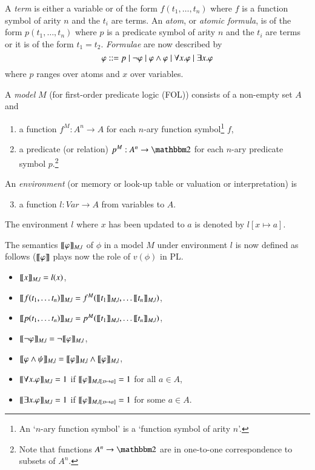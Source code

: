 \noindent
A \emph{term} is either a variable or of the form $f(t_1,\ldots,t_n)$
where $f$ is a function symbol of arity $n$ and the $t_i$ are terms.
An \emph{atom}, or \emph{atomic formula}, is of the form
$p(t_1,\ldots,t_n)$ where $p$ is a predicate symbol of arity $n$ and
the $t_i$ are terms or it is of the form $t_1=t_2$. \emph{Formulae}
are now described by
%
$$\varphi ::= p \mid  \neg\varphi \mid \varphi\wedge\varphi \mid
\forall x.\varphi\mid\exists x.\varphi$$
where $p$ ranges over atoms and $x$
over variables.

\bigskip\noindent A \emph{model} $M$ (for first-order predicate logic
(FOL)) consists of a non-empty set $A$ and
\begin{enumerate}
\item a function $f^M:A^n\to A$ for each
$n$-ary function symbol\footnote{An `$n$-ary function symbol' is a
  `function symbol of arity $n$'.}  $f$, 
\item a predicate (or relation) $p^M: A^n\to\bbtwo$ for each $n$-ary
  predicate symbol $p$.\footnote{Note that functions $A^n\to\bbtwo$ are in
    one-to-one correspondence to subsets of $A^n$.}
\end{enumerate}

\medskip\noindent
An \emph{environment} (or memory or look-up table or valuation or
interpretation) is
\begin{enumerate}\setcounter{enumi}{2}
\item a function $l:\mathit{Var}\to A$ from variables to
$A$.
\end{enumerate}
The environment $l$ where $x$ has been updated to $a$ is denoted by
$l[x\mapsto a]$. 

\bigskip\noindent
The semantics $[\![\varphi]\!]_{M,l}$ of $\phi$ in a model $M$ under
environment $l$ is now defined as follows ($[\![\varphi]\!]$ plays now the
role of $v(\phi)$ in PL.
%
\begin{itemize}
\item $[\![x]\!]_{M,l}=l(x)$,
\item $[\![f(t_1,\ldots t_n)]\!]_{M,l}=f^M([\![t_1]\!]_{M,l},\ldots
  [\![t_n]\!]_{M,l})$,
\item $[\![p(t_1,\ldots t_n)]\!]_{M,l}=p^M([\![t_1]\!]_{M,l},\ldots
  [\![t_n]\!]_{M,l})$,
\item $[\![\neg\varphi]\!]_{M,l}=\neg[\![\varphi]\!]_{M,l}$,
\item $[\![\varphi\wedge\psi]\!]_{M,l}=[\![\varphi]\!]_{M,l}\wedge[\![\varphi]\!]_{M,l}$,
\item $[\![\forall x.\varphi]\!]_{M,l}=1$ if $[\![\varphi]\!]_{M,l[x\mapsto
    a]}=1$ for all $a\in A$,
\item $[\![\exists x. \varphi]\!]_{M,l}=1$ if $[\![\varphi]\!]_{M,l[x\mapsto
    a]}=1$ for some $a\in A$.
\end{itemize}

